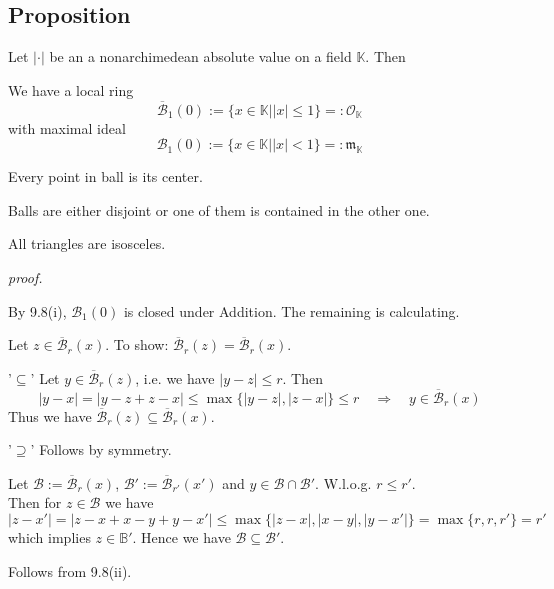 \documentclass[12pt]{book}
\begin{document}
\begin{spacing}{1.3}
\subsection{Proposition} %
Let $|\cdot|$ be an a nonarchimedean absolute value on a field $\mathbb{K}$. Then 
\begin{compactenum}
\item We have a local ring $$\overline{\mathcal{B}}_1(0):=\{x \in \mathbb{K} \big \vert |x|\leqslant 1 \}=:\mathcal{O}_{\mathbb{K}}$$with maximal ideal $$\mathcal{B}_1(0):=\{x \in \mathbb{K} \big \vert |x| < 1 \}=:\mathfrak{m}_{\mathbb{K}}$$
\item Every point in  ball is its center.
\item Balls are either disjoint or one of them is contained in the other one.
\item All triangles are isosceles.
\end{compactenum}
\textit{proof.}
\begin{compactenum}
\item By 9.8(i), $\mathcal{B}_1(0)$ is closed under Addition. The remaining is calculating.
\item Let $z \in \overline{\mathcal{B}}_r(x)$. To show: $\overline{\mathcal{B}}_r(z)=\overline{\mathcal{B}}_r(x)$.
\begin{compactitem}
\item['$\subseteq$'] Let $y \in \overline{\mathcal{B}}_r(z)$, i.e. we have $|y-z|\leqslant r$. Then
$$|y-x|=|y-z+z-x| \leqslant \max\{|y-z|, |z-x|\} \leqslant r \quad \Rightarrow \quad y \in \overline{\mathcal{B}}_r(x) $$
Thus we have $\overline{\mathcal{B}}_r(z) \subseteq \overline{\mathcal{B}}_r(x)$.
\item['$\supseteq$'] Follows by symmetry.
\end{compactitem}
\item Let $\mathcal{B}:= \overline{\mathcal{B}}_r(x)$, $\mathcal{B}':=\overline{\mathcal{B}}_{r'}(x')$ and $y \in \mathcal{B} \cap \mathcal{B'}$. W.l.o.g. $r \leqslant r'$.\\
Then for $z \in \mathcal{B}$ we have
$$|z-x'|=|z-x+x-y+y-x'| \leqslant \max\{|z-x|, |x-y|, |y-x'|\} = \max\{r,r,r'\}=r'$$
which implies $z \in \mathbb{B}'$. Hence we have $\mathcal{B} \subseteq \mathcal{B}'$. 
\item Follows from 9.8(ii).
\end{compactenum}


\end{spacing}
\end{document}

